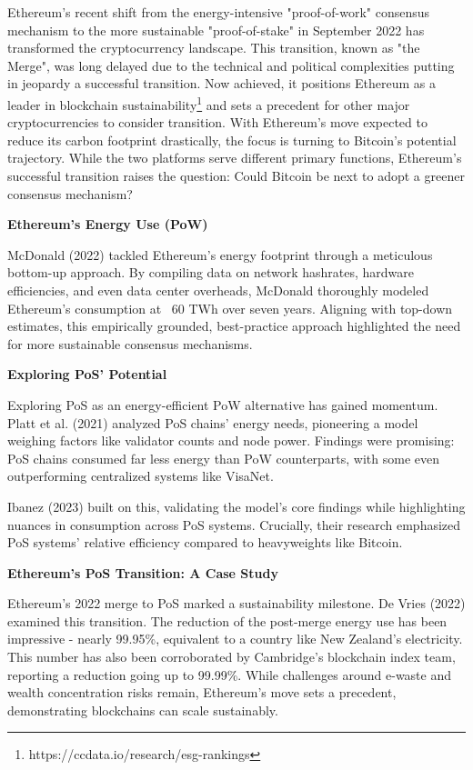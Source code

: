 \documentclass[11pt]{report}
\begin{document}
Ethereum's recent shift from the energy-intensive "proof-of-work" consensus mechanism to the more sustainable "proof-of-stake" in September 2022 has transformed the cryptocurrency landscape. This transition, known as "the Merge", was long delayed due to the technical and political complexities putting in jeopardy a successful transition\cite{bloombergnewsEthereumMergeYour2022}. Now achieved, it positions Ethereum as a leader in blockchain sustainability\footnote{https://ccdata.io/research/esg-rankings} and sets a precedent for other major cryptocurrencies to consider transition. With Ethereum's move expected to reduce its carbon footprint drastically, the focus is turning to Bitcoin's potential trajectory. While the two platforms serve different primary functions, Ethereum's successful transition raises the question: Could Bitcoin be next to adopt a greener consensus mechanism?


\textbf{Ethereum's Energy Use (PoW)}

McDonald (2022)\cite{mcdonaldEthereumEmissionsBottomup2022} tackled Ethereum's energy footprint through a meticulous bottom-up approach. By compiling data on network hashrates, hardware efficiencies, and even data center overheads, McDonald thoroughly modeled Ethereum's consumption at ~60 TWh over seven years. Aligning with top-down estimates, this empirically grounded, best-practice approach highlighted the need for more sustainable consensus mechanisms.

\textbf{Exploring PoS' Potential}

Exploring PoS as an energy-efficient PoW alternative has gained momentum. Platt et al. (2021)\cite{plattEnergyFootprintBlockchain2021} analyzed PoS chains' energy needs, pioneering a model weighing factors like validator counts and node power. Findings were promising: PoS chains consumed far less energy than PoW counterparts, with some even outperforming centralized systems like VisaNet.

Ibanez (2023) built on this, validating the model's core findings while highlighting nuances in consumption across PoS systems. Crucially, their research emphasized PoS systems' relative efficiency compared to heavyweights like Bitcoin.

\textbf{Ethereum's PoS Transition: A Case Study}

Ethereum's 2022 merge to PoS marked a sustainability milestone. De Vries (2022)\cite{devriesCryptocurrenciesRoadSustainability2022} examined this transition. The reduction of the post-merge energy use has been impressive - nearly 99.95\%, equivalent to a country like New Zealand's electricity. This number has also been corroborated by Cambridge's blockchain index team, reporting a reduction going up to 99.99\%\cite{CambridgeEthereumElectricity}. While challenges around e-waste and wealth concentration risks remain, Ethereum's move sets a precedent, demonstrating blockchains can scale sustainably.
\end{document}
